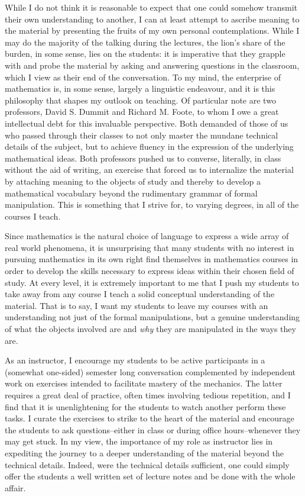 While I do not think it is reasonable to expect that one could somehow transmit their own understanding to another, I can at least attempt to ascribe meaning to the material by presenting the fruits of my own personal contemplations.
While I may do the majority of the talking during the lectures, the lion's share of the burden, in some sense, lies on the students: it is imperative that they grapple with and probe the material by asking and answering questions in the classroom, which I view as their end of the conversation.
To my mind, the enterprise of mathematics is, in some sense, largely a linguistic endeavour, and it is this philosophy that shapes my outlook on teaching.
Of particular note are two professors, David S. Dummit and Richard M. Foote, to whom I owe a great intellectual debt for this invaluable perspective.
Both demanded of those of us who passed through their classes to not only master the mundane technical details of the subject, but to achieve fluency in the expression of the underlying mathematical ideas.
Both professors pushed us to converse, literally, in class without the aid of writing, an exercise that forced us to internalize the material by attaching meaning to the objects of study and thereby to develop a mathematical vocabulary beyond the rudimentary grammar of formal manipulation.
This is something that I strive for, to varying degrees, in all of the courses I teach.

Since mathematics is the natural choice of language to express a wide array of real world phenomena, it is unsurprising that many students with no interest in pursuing mathematics in its own right find themselves in mathematics courses in order to develop the skills necessary to express ideas within their chosen field of study.
At every level, it is extremely important to me that I push my students to take away from any course I teach a solid conceptual understanding of the material.
That is to say, I want my students to leave my courses with an understanding not just of the formal manipulations, but a genuine understanding of what the objects involved are and \textit{why} they are manipulated in the ways they are.

As an instructor, I encourage my students to be active participants in a (somewhat one-sided) semester long conversation complemented by independent work on exercises intended to facilitate mastery of the mechanics.
The latter requires a great deal of practice, often times involving tedious repetition, and I find that it is unenlightening for the students to watch another perform these tasks.
I curate the exercises to strike to the heart of the material and encourage the students to ask questions--either in class or during office hours--whenever they may get stuck.
In my view, the importance of my role as instructor lies in expediting the journey to a deeper understanding of the material beyond the technical details.
Indeed, were the technical details sufficient, one could simply offer the students a well written set of lecture notes and be done with the whole affair.

